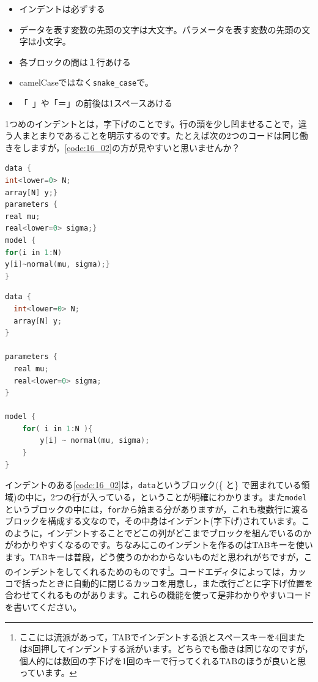 \documentclass{ltjsbook}
\begin{document}
\begin{itemize}
	\item インデントは必ずする
	\item データを表す変数の先頭の文字は大文字。パラメータを表す変数の先頭の文字は小文字。
	\item 各ブロックの間は１行あける
	\item camelCaseではなく\verb|snake_case|で。
	\item 「~」や「＝」の前後は1スペースあける
\end{itemize}

1つめのインデントとは，字下げのことです。行の頭を少し凹ませることで，違う人まとまりであることを明示するのです。たとえば次の2つのコードは同じ働きをしますが，\ref{code:16_02}の方が見やすいと思いませんか？
\begin{lstlisting}[language=c++,label={code:16_01},caption={インデントのないコード}]
data {
int<lower=0> N;
array[N] y;}
parameters {
real mu;
real<lower=0> sigma;}
model {
for(i in 1:N)
y[i]~normal(mu, sigma);}
}
\end{lstlisting}


\begin{lstlisting}[language=c++,label={code:16_02},caption={インデントのあるコード}]
data {
  int<lower=0> N;
  array[N] y;
}

parameters {
  real mu;
  real<lower=0> sigma;
}

model {
    for( i in 1:N ){
        y[i] ~ normal(mu, sigma);
    }
}
\end{lstlisting}
インデントのある\ref{code:16_02}は，\texttt{data}というブロック(\{ と\} で囲まれている領域)の中に，2つの行が入っている，ということが明確にわかります。また\texttt{model}というブロックの中には，\texttt{for}から始まる分がありますが，これも複数行に渡るブロックを構成する文なので，その中身はインデント(字下げ)されています。このように，インデントすることでどこの列がどこまでブロックを組んでいるのかがわかりやすくなるのです。ちなみにこのインデントを作るのはTABキーを使います。TABキーは普段，どう使うのかわからないものだと思われがちですが，このインデントをしてくれるためのものです\footnote{ここには流派があって，TABでインデントする派とスペースキーを4回または8回押してインデントする派がいます。どちらでも働きは同じなのですが，個人的には数回の字下げを1回のキーで行ってくれるTABのほうが良いと思っています。}。コードエディタによっては，カッコで括ったときに自動的に閉じるカッコを用意し，また改行ごとに字下げ位置を合わせてくれるものがあります。これらの機能を使って是非わかりやすいコードを書いてください。
\end{document}
